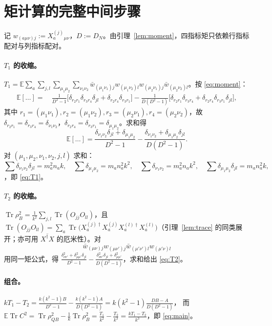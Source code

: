 \documentclass[11pt,a4paper]{ctexart}
\theoremstyle{definition}
\newcommand{\Tr}{\operatorname{Tr}}
\newcommand{\E}{\mathbb{E}}
\begin{document}
\appendix

\section{矩计算的完整中间步骤}
\label{app:proof}

记 $w_{(a\mu\nu)j}:=X_a^{(j)}{}_{\mu\nu}$，$D:=D_N$。由引理~\ref{lem:moment}，四指标矩只依赖行指标配对与列指标配对。

\paragraph{$T_1$ 的收缩。}
$T_1=\E\sum_a\sum_{j,l}\sum_{\mu_1\mu_2}\sum_{\nu_1\nu_2}\bar w_{(\mu_1\nu_1)j}w_{(\mu_1\nu_2)l}w_{(\mu_2\nu_1)j}\bar w_{(\mu_2\nu_2)l}$。按 \eqref{eq:moment}：
\begin{align*}
\mathbb E[\ldots]=&\ \frac{1}{D^2-1}\Big[\delta_{r_2r_1}\delta_{r_3r_4}\delta_{jl}+\delta_{r_2r_4}\delta_{r_3r_1}\Big]
-\frac{1}{D(D^2-1)}\Big[\delta_{r_2r_1}\delta_{r_3r_4}+\delta_{r_2r_4}\delta_{r_3r_1}\delta_{jl}\Big],
\end{align*}
其中 $r_1=(\mu_1\nu_1),r_2=(\mu_1\nu_2),r_3=(\mu_2\nu_1),r_4=(\mu_2\nu_2)$，故
$\delta_{r_2r_1}=\delta_{r_3r_4}=\delta_{\nu_1\nu_2}$，$\delta_{r_2r_4}=\delta_{r_3r_1}=\delta_{\mu_1\mu_2}$。求和得
\[
\E[\ldots]=\frac{\delta_{\nu_1\nu_2}\delta_{jl}+\delta_{\mu_1\mu_2}}{D^2-1}
-\frac{\delta_{\nu_1\nu_2}+\delta_{\mu_1\mu_2}\delta_{jl}}{D(D^2-1)} .
\]
对 $(\mu_1,\mu_2,\nu_1,\nu_2,j,l)$ 求和：\[
\textstyle\sum\delta_{\nu_1\nu_2}\delta_{jl}=m_a^2n_ak,\quad
\sum\delta_{\mu_1\mu_2}=m_an_a^2k^2,\quad
\sum\delta_{\nu_1\nu_2}=m_a^2n_ak^2,\quad
\sum\delta_{\mu_1\mu_2}\delta_{jl}=m_an_a^2k,
\]
，即 \eqref{eq:T1}。

\paragraph{$T_2$ 的收缩。}
$\Tr\rho_B^2=\frac1{k^2}\sum_{j,l}\Tr(O_{jj}O_{ll})$，且
$\Tr(O_{jj}O_{ll})=\sum_a\Tr\big(X_a^{(j)\dagger}X_a^{(j)}X_a^{(l)\dagger}X_a^{(l)}\big)$（引理~\ref{lem:trace} 的同类展开；亦可用 $\overline{X^\dagger X}$ 的厄米性）。对
\[
\bar w_{(\mu\nu)j}w_{(\mu\nu')j}\bar w_{(\mu'\nu')l}w_{(\mu'\nu)l}
\]
 用同一矩公式，得
$\frac{\delta_{\nu\nu'}^2+\delta_{\mu\mu'}^2\delta_{jl}}{D^2-1}-\frac{\delta_{\nu\nu'}^2\delta_{jl}+\delta_{\mu\mu'}^2}{D(D^2-1)}$，求和给出 \eqref{eq:T2}。

\paragraph{组合。}
$kT_1-T_2=\frac{k(k^2-1)B}{D^2-1}-\frac{k(k^2-1)A}{D(D^2-1)}=k(k^2-1)\frac{DB-A}{D(D^2-1)}$，
而 $\E\Tr C^2=\Tr\rho_{QB}^2-\frac1k\Tr\rho_B^2=\frac{T_1}{k^2}-\frac{T_2}{k^3}=\frac{kT_1-T_2}{k^3}$，即 \eqref{eq:main}。
\end{document}
